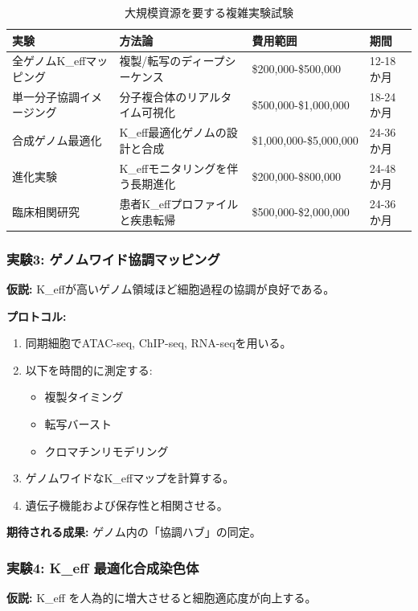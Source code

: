 \documentclass[12pt]{article}
\begin{document}
	\begin{table}[H]
		\centering
		\caption{大規模資源を要する複雑実験試験}
		\footnotesize
		\begin{tabular}{p{3.5cm} p{5cm} p{3cm} p{2cm}}
			\toprule
			\textbf{実験} & \textbf{方法論} & \textbf{費用範囲} & \textbf{期間} \\
			\midrule
			全ゲノムK\_effマッピング & 複製/転写のディープシーケンス & \$200,000-\$500,000 & 12-18か月 \\
			単一分子協調イメージング & 分子複合体のリアルタイム可視化 & \$500,000-\$1,000,000 & 18-24か月 \\
			合成ゲノム最適化 & K\_eff最適化ゲノムの設計と合成 & \$1,000,000-\$5,000,000 & 24-36か月 \\
			進化実験 & K\_effモニタリングを伴う長期進化 & \$200,000-\$800,000 & 24-48か月 \\
			臨床相関研究 & 患者K\_effプロファイルと疾患転帰 & \$500,000-\$2,000,000 & 24-36か月 \\
			\bottomrule
		\end{tabular}
	\end{table}
	
	\subsubsection{実験3: ゲノムワイド協調マッピング}
	\textbf{仮説:} K\_effが高いゲノム領域ほど細胞過程の協調が良好である。
	
	\textbf{プロトコル:}
	\begin{enumerate}
		\item 同期細胞でATAC-seq, ChIP-seq, RNA-seqを用いる。
		\item 以下を時間的に測定する:
		\begin{itemize}
			\item 複製タイミング
			\item 転写バースト
			\item クロマチンリモデリング
		\end{itemize}
		\item ゲノムワイドなK\_effマップを計算する。
		\item 遺伝子機能および保存性と相関させる。
	\end{enumerate}
	
	\textbf{期待される成果:} ゲノム内の「協調ハブ」の同定。
	
	\subsubsection{実験4: K\_eff 最適化合成染色体}
	\textbf{仮説:} K\_eff を人為的に増大させると細胞適応度が向上する。
	
\end{document}
